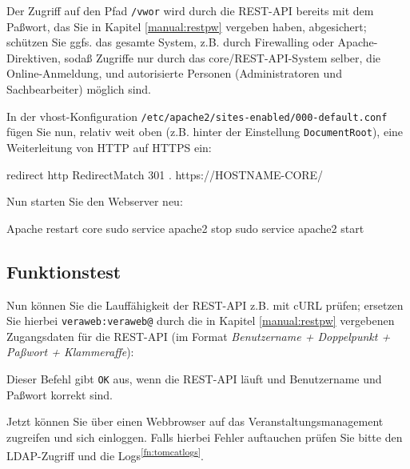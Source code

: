 Der Zugriff auf den Pfad \texttt{/vwor} wird durch die REST-API bereits
mit dem Paßwort, das Sie in Kapitel \ref{manual:restpw} vergeben haben,
abgesichert; schützen Sie ggfs. das gesamte System, z.B. durch Firewalling
oder Apache-Direktiven, sodaß Zugriffe nur durch das core/REST-API-System
selber, die Online-Anmeldung, und autorisierte Personen (Administratoren
und Sachbearbeiter) möglich sind.

\begin{minipage}{\linewidth}
In der vhost-Konfiguration \texttt{/etc/apache2/sites-enabled/000-default.conf}
fügen Sie nun, relativ weit oben (z.B. hinter der Einstellung
\texttt{DocumentRoot}), eine Weiterleitung von HTTP auf HTTPS ein:

\begin{lstdump}{redirect http}
RedirectMatch 301 . https://HOSTNAME-CORE/
\end{lstdump}
\end{minipage}

\begin{minipage}{\linewidth}
Nun starten Sie den Webserver neu:

\begin{lstdump}{Apache restart core}
sudo service apache2 stop
sudo service apache2 start
\end{lstdump}
\end{minipage}

\subsection{Funktionstest}\label{subsec:setup-core-check}

\begin{minipage}{\linewidth}
Nun können Sie die Lauffähigkeit der REST-API z.B. mit cURL prüfen;
ersetzen Sie hierbei \texttt{veraweb:veraweb@} durch die in Kapitel
\ref{manual:restpw} vergebenen Zugangsdaten für die REST-API (im
Format {\itshape Benutzername + Doppelpunkt + Paßwort + Klammeraffe}):


Dieser Befehl gibt \texttt{OK} aus, wenn die REST-API läuft und
Benutzername und Paßwort korrekt sind.
\end{minipage}

Jetzt können Sie über einen Webbrowser auf das Veranstaltungsmanagement
zugreifen und sich einloggen. Falls hierbei Fehler auftauchen prüfen Sie
bitte den LDAP-Zugriff und die Logs\Hair\textsuperscript{\ref{fn:tomcatlogs}}.


